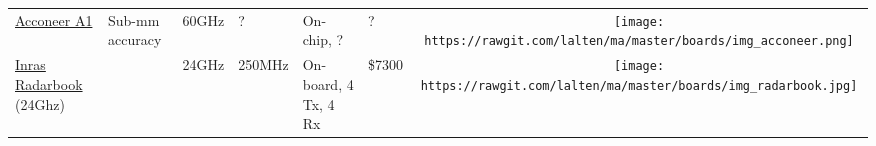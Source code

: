 \begin{longtable}[]{@{}llllllc@{}}
\begin{minipage}[t]{0.09\columnwidth}\raggedright\strut
	\href{ http://www.acconeer.com/}{Acconeer A1}
\strut\end{minipage} &
\begin{minipage}[t]{0.13\columnwidth}\raggedright\strut
Sub-mm accuracy
\strut\end{minipage} &
\begin{minipage}[t]{0.09\columnwidth}\raggedright\strut
60GHz
\strut\end{minipage} &
\begin{minipage}[t]{0.11\columnwidth}\raggedright\strut
?
\strut\end{minipage} &
\begin{minipage}[t]{0.10\columnwidth}\raggedright\strut
On-chip, ?
\strut\end{minipage} &
\begin{minipage}[t]{0.15\columnwidth}\raggedright\strut
?
\strut\end{minipage} &
\begin{minipage}[t]{0.10\columnwidth}\centering\strut
\texttt{[image: https://rawgit.com/lalten/ma/master/boards/img\_acconeer.png]}
\strut\end{minipage}\tabularnewline

\begin{minipage}[t]{0.09\columnwidth}\raggedright\strut
\href{dkradarbook}{Inras Radarbook} (24Ghz)
\strut\end{minipage} &
\begin{minipage}[t]{0.13\columnwidth}\raggedright\strut

\strut\end{minipage} &
\begin{minipage}[t]{0.09\columnwidth}\raggedright\strut
24GHz
\strut\end{minipage} &
\begin{minipage}[t]{0.11\columnwidth}\raggedright\strut
250MHz
\strut\end{minipage} &
\begin{minipage}[t]{0.10\columnwidth}\raggedright\strut
On-board, 4 Tx, 4 Rx
\strut\end{minipage} &
\begin{minipage}[t]{0.15\columnwidth}\raggedright\strut
\$7300
\strut\end{minipage} &
\begin{minipage}[t]{0.10\columnwidth}\centering\strut
\texttt{[image: https://rawgit.com/lalten/ma/master/boards/img\_radarbook.jpg]}
\strut\end{minipage}\tabularnewline


\end{longtable}
